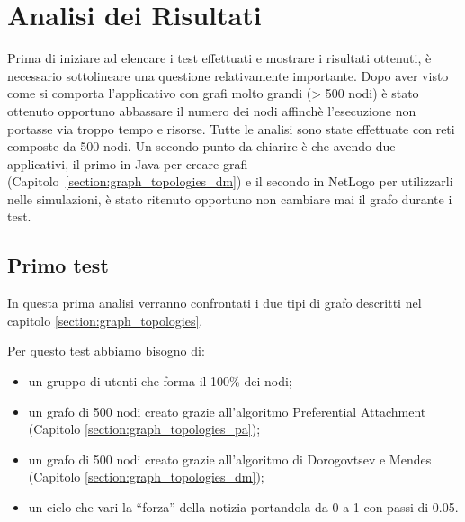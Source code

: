 \section{Analisi dei Risultati}
\label{section:analisirisultati}

Prima di iniziare ad elencare i test effettuati e mostrare i risultati ottenuti, è
necessario sottolineare una questione relativamente importante.
Dopo aver visto come si comporta l'applicativo con grafi molto grandi (> 500 nodi) è stato ottenuto opportuno
abbassare il numero dei nodi affinchè l'esecuzione non portasse via troppo tempo e risorse.
Tutte le analisi sono state effettuate con reti composte da 500 nodi.
Un secondo punto da chiarire è che avendo due applicativi, 
il primo in Java per creare grafi (Capitolo~\ref{section:graph_topologies_dm}) e il secondo in NetLogo per utilizzarli nelle simulazioni,
è stato ritenuto opportuno non cambiare mai il grafo durante i test.


\subsection{Primo test}
\label{section:first_test}

In questa prima analisi verranno confrontati i due tipi di grafo descritti nel capitolo \ref{section:graph_topologies}.

Per questo test abbiamo bisogno di:
\begin{itemize}
\item un gruppo di utenti che forma il 100\% dei nodi;
\item un grafo di 500 nodi creato grazie all'algoritmo Preferential Attachment (Capitolo \ref{section:graph_topologies_pa});
\item un grafo di 500 nodi creato grazie all'algoritmo di Dorogovtsev e Mendes (Capitolo \ref{section:graph_topologies_dm});
\item un ciclo che vari la ``forza'' della notizia portandola da 0 a 1 con passi di 0.05.
\end{itemize}



